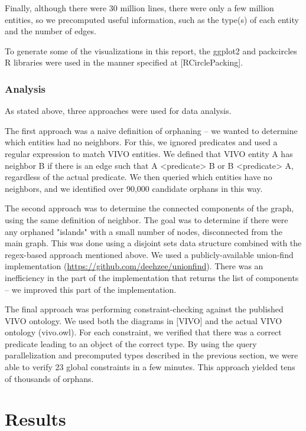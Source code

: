 \documentclass[11pt]{article}
\begin{document}
Finally, although there were 30 million lines, there were only a few million entities, so we precomputed useful information, such as the type(s) of each entity and the number of edges.

To generate some of the visualizations in this report, the ggplot2 and packcircles R libraries were used in the manner specified at [RCirclePacking].

\subsubsection*{Analysis}
As stated above, three approaches were used for data analysis.

The first approach was a naive definition of orphaning -- we wanted to determine which entities had no neighbors. For this, we ignored predicates and used a regular expression to match VIVO entities. We defined that VIVO entity A has neighbor B if there is an edge such that A <predicate> B or B <predicate> A, regardless of the actual predicate. We then queried which entities have no neighbors, and we identified over 90,000 candidate orphans in this way.

The second approach was to determine the connected components of the graph, using the same definition of neighbor. The goal was to determine if there were any orphaned "islands" with a small number of nodes, disconnected from the main graph. This was done using a disjoint sets data structure combined with the regex-based approach mentioned above. We used a publicly-available union-find implementation (\url{https://github.com/deehzee/unionfind}). There was an inefficiency in the part of the implementation that returns the list of components -- we improved this part of the implementation.

The final approach was performing constraint-checking against the published VIVO ontology. We used both the diagrams in [VIVO] and the actual VIVO ontology (vivo.owl). For each constraint, we verified that there was a correct predicate leading to an object of the correct type. By using the query parallelization and precomputed types described in the previous section, we were able to verify 23 global constraints in a few minutes. This approach yielded tens of thousands of orphans.

\section*{Results}
\end{document}
